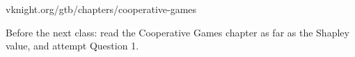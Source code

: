 \vspace{0.45cm}

{\color{inkgrey} vknight.org/gtb/chapters/cooperative-games}

\vspace{0.3cm}

{\large Before the next class: read the Cooperative Games chapter as far as the
  Shapley value,
  and attempt Question 1.}


